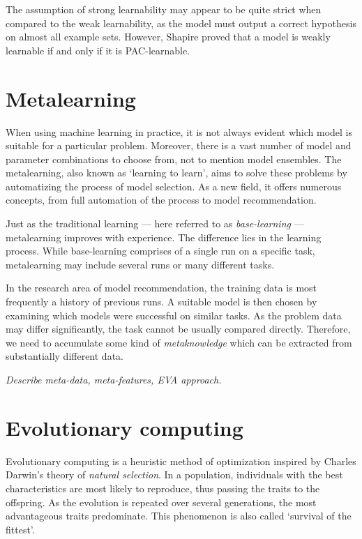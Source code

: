 The assumption of strong learnability may appear to be quite strict when 
compared to the weak learnability, as the model must output a correct 
hypothesis on almost all example sets. However, Shapire proved that a model 
is weakly learnable if and only if it is PAC-learnable. 
\cite{Schapire:1990:SWL:83637.83645}



\section{Metalearning}
When using machine learning in practice, it is not always evident which model
is suitable for a particular problem. Moreover, there is a vast number of model
and parameter combinations to choose from, not to mention model ensembles. The metalearning, also known as `learning to learn', aims to solve these 
problems by automatizing the process of model selection. As a new field, it
offers numerous concepts, from full automation of the process to model 
recommendation.

Just as the traditional learning --- here referred to as \emph{base-learning}
--- metalearning improves with experience. The difference lies in the learning
process. While base-learning comprises of a single run on a specific task,
metalearning may include several runs or many different tasks.

In the research area of model recommendation, the training data is most
frequently a history of previous runs. A suitable model is then chosen by
examining which models were successful on similar tasks. As the problem data
may differ significantly, the task cannot be usually compared directly.
Therefore, we need to accumulate some kind of \emph{metaknowledge} which
can be extracted from substantially different data.

\textit{Describe meta-data, meta-features, EVA approach.}

\section{Evolutionary computing}
Evolutionary computing is a heuristic method of optimization inspired by 
Charles Darwin's theory of \emph{natural selection}. \cite{darwin} In 
a population, individuals with the best characteristics are most likely
to reproduce, thus passing the traits to the offspring. As the evolution 
is repeated over several generations, the most advantageous traits 
predominate. This phenomenon is also called `survival of the fittest'. 

